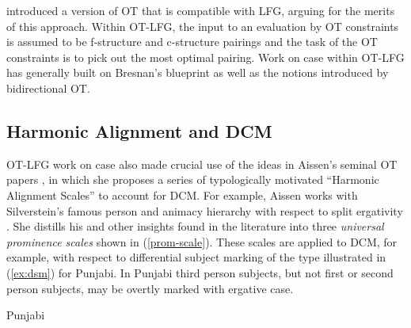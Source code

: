 \documentclass[output=paper,hidelinks]{langscibook}
\begin{document}
\citet{bresnan00opt} introduced a version of OT that is compatible with LFG,
arguing for the merits of this approach.  Within OT-LFG, the input to an
evaluation by OT constraints is assumed to be f-structure and c-structure
pairings and the task of the OT constraints is to pick out the most optimal
pairing.  Work on case within OT-LFG has generally built on Bresnan's blueprint
as well as the notions introduced by bidirectional OT.



\subsection{Harmonic Alignment and DCM}

OT-LFG work on case also made crucial use of the ideas in Aissen's seminal OT
papers  \citep{Aissen1999,Aissen2003}, in which she proposes
a series of  typologically motivated ``Harmonic Alignment Scales'' to account
for DCM.
For example, Aissen works with Silverstein's famous person and animacy hierarchy
with respect to split ergativity \citep{Silverstein}.  She distills his and
other insights found in the literature into three {\em universal prominence
  scales} shown in (\ref{prom-scale}). These scales are applied to DCM, for
example, with respect to differential subject marking of the type illustrated in
(\ref{ex:dsm}) for Punjabi.  In Punjabi third person subjects, but not first or
second person subjects, may be overtly marked with ergative case.

\begin{exe}
  \ex \label{ex:dsm}
Punjabi
  \begin{xlist}
\end{xlist}
\end{exe} 
\end{document}
